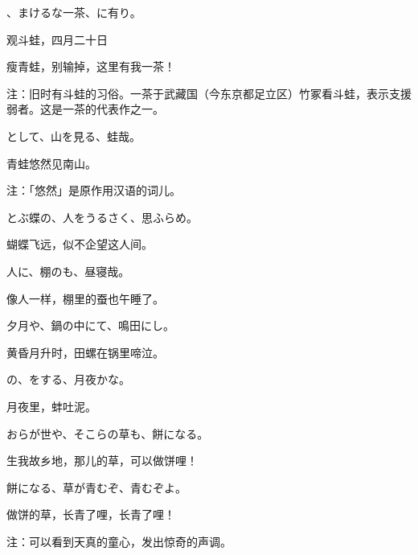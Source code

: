 \begin{haiku}
    {\FH {}、まけるな一茶、に有り。}

    {\FK 观斗蛙，四月二十日}

    {\FK 瘦青蛙，别输掉，这里有我一茶！}

    {\FT 注：旧时有斗蛙的习俗。一茶于武藏国（今东京都足立区）竹冢看斗蛙，表示支援弱者。这是一茶的代表作之一。}
\end{haiku}

\begin{haiku}
    {\FH {}として、山を見る、蛙哉。}

    {\FK 青蛙悠然见南山。}

    {\FT 注：「悠然」是原作用汉语的词儿。}
\end{haiku}

\begin{haiku}
    {\FH とぶ蝶の、人をうるさく、思ふらめ。}

    {\FK 蝴蝶飞远，似不企望这人间。}
\end{haiku}

\begin{haiku}
    {\FH 人に、棚のも、昼寝哉。}

    {\FK 像人一样，棚里的蚕也午睡了。}
\end{haiku}

\begin{haiku}
    {\FH 夕月や、鍋の中にて、鳴田にし。}

    {\FK 黄昏月升时，田螺在锅里啼泣。}
\end{haiku}

\begin{haiku}
    {\FH {}の、をする、月夜かな。}

    {\FK 月夜里，蚌吐泥。}
\end{haiku}

\begin{haiku}
    {\FH おらが世や、そこらの草も、餅になる。}

    {\FK 生我故乡地，那儿的草，可以做饼哩！}
\end{haiku}

\begin{haiku}
    {\FH 餅になる、草が青むぞ、青むぞよ。}

    {\FK 做饼的草，长青了哩，长青了哩！}

    {\FT 注：可以看到天真的童心，发出惊奇的声调。}
\end{haiku}


